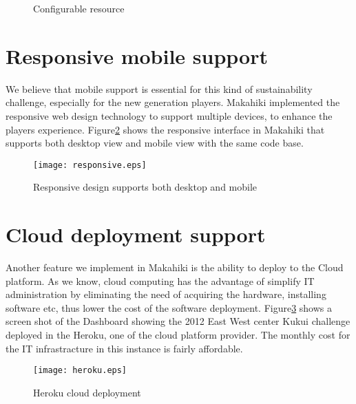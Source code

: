 \begin{figure}[htbp]
	\centering
		\caption{Configurable resource}
		\label{fig:resource}
\end{figure}

\section{Responsive mobile support}
We believe that mobile support is essential for this kind of sustainability challenge, especially for the new generation players. Makahiki implemented the responsive web design technology to support multiple devices, to enhance the players experience. Figure\ref{fig:responsive} shows the responsive interface in Makahiki that supports both desktop view and mobile view with the same code base.

\begin{figure}[t!]
  \center
  \texttt{[image: responsive.eps]}
  \caption{Responsive design supports both desktop and mobile}
  \label{fig:responsive}
\end{figure}

\section{Cloud deployment support}
Another feature we implement in Makahiki is the ability to deploy to the Cloud platform. As we know, cloud computing has the advantage of simplify IT administration by eliminating the need of acquiring the hardware, installing software etc, thus lower the cost of the software deployment. Figure\ref{fig:heroku} shows a screen shot of the Dashboard showing the 2012 East West center Kukui challenge deployed in the Heroku, one of the cloud platform provider. The monthly cost for the IT infrastracture in this instance is fairly affordable. 

\begin{figure}[t!]
  \center
  \texttt{[image: heroku.eps]}
  \caption{Heroku cloud deployment}
  \label{fig:heroku}
\end{figure}
